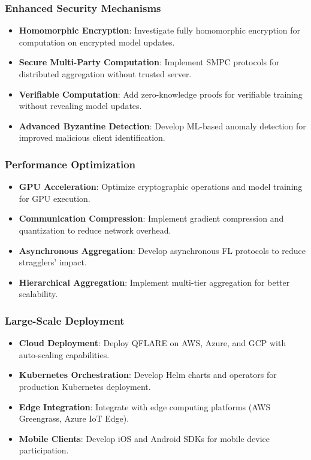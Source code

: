 \documentclass[12pt,a4paper]{article}
\begin{document}
\subsubsection{Enhanced Security Mechanisms}

\begin{itemize}
    \item \textbf{Homomorphic Encryption}: Investigate fully homomorphic encryption for computation on encrypted model updates.
    \item \textbf{Secure Multi-Party Computation}: Implement SMPC protocols for distributed aggregation without trusted server.
    \item \textbf{Verifiable Computation}: Add zero-knowledge proofs for verifiable training without revealing model updates.
    \item \textbf{Advanced Byzantine Detection}: Develop ML-based anomaly detection for improved malicious client identification.
\end{itemize}

\subsubsection{Performance Optimization}

\begin{itemize}
    \item \textbf{GPU Acceleration}: Optimize cryptographic operations and model training for GPU execution.
    \item \textbf{Communication Compression}: Implement gradient compression and quantization to reduce network overhead.
    \item \textbf{Asynchronous Aggregation}: Develop asynchronous FL protocols to reduce stragglers' impact.
    \item \textbf{Hierarchical Aggregation}: Implement multi-tier aggregation for better scalability.
\end{itemize}

\subsubsection{Large-Scale Deployment}

\begin{itemize}
    \item \textbf{Cloud Deployment}: Deploy QFLARE on AWS, Azure, and GCP with auto-scaling capabilities.
    \item \textbf{Kubernetes Orchestration}: Develop Helm charts and operators for production Kubernetes deployment.
    \item \textbf{Edge Integration}: Integrate with edge computing platforms (AWS Greengrass, Azure IoT Edge).
    \item \textbf{Mobile Clients}: Develop iOS and Android SDKs for mobile device participation.
\end{itemize}
\end{document}
